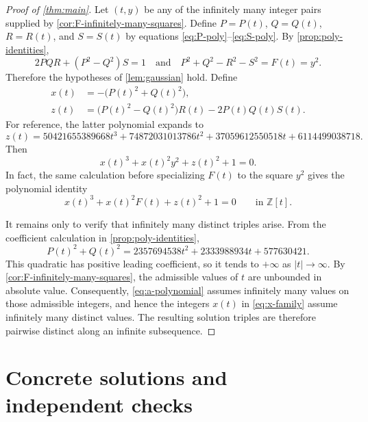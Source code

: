 \documentclass[11pt]{article}
\theoremstyle{remark}
\newcommand{\Z}{\mathbb Z}
\begin{document}
\begin{proof}[Proof of \cref{thm:main}]
Let $(t,y)$ be any of the infinitely many integer pairs supplied by \cref{cor:F-infinitely-many-squares}.  Define $P=P(t)$, $Q=Q(t)$, $R=R(t)$, and $S=S(t)$ by equations \eqref{eq:P-poly}--\eqref{eq:S-poly}.  By \cref{prop:poly-identities},
\[
 2PQR+(P^2-Q^2)S=1
 \quad\text{and}\quad
 P^2+Q^2-R^2-S^2=F(t)=y^2.
\]
Therefore the hypotheses of \cref{lem:gaussian} hold.  Define
\begin{align}
 x(t)&=-\bigl(P(t)^2+Q(t)^2\bigr), \label{eq:x-family}\\
 z(t)&=\bigl(P(t)^2-Q(t)^2\bigr)R(t)-2P(t)Q(t)S(t). \label{eq:z-family}
\end{align}
For reference, the latter polynomial expands to
\begin{equation}\label{eq:z-expanded}
 z(t)=50421655389668t^3+74872031013786t^2
      +37059612550518t+6114499038718.
\end{equation}
Then
\[
 x(t)^3+x(t)^2y^2+z(t)^2+1=0.
\]
In fact, the same calculation before specializing $F(t)$ to the square $y^2$ gives the polynomial identity
\begin{equation}\label{eq:master-polynomial-identity}
 x(t)^3+x(t)^2F(t)+z(t)^2+1=0
 \qquad\text{in }\Z[t].
\end{equation}

It remains only to verify that infinitely many distinct triples arise.  From the coefficient calculation in \cref{prop:poly-identities},
\begin{equation}\label{eq:a-polynomial}
 P(t)^2+Q(t)^2
 =2357694538t^2+2333988934t+577630421.
\end{equation}
This quadratic has positive leading coefficient, so it tends to $+\infty$ as $|t|\to\infty$.  By \cref{cor:F-infinitely-many-squares}, the admissible values of $t$ are unbounded in absolute value.  Consequently, \eqref{eq:a-polynomial} assumes infinitely many values on those admissible integers, and hence the integers $x(t)$ in \eqref{eq:x-family} assume infinitely many distinct values.  The resulting solution triples are therefore pairwise distinct along an infinite subsequence.
\end{proof}



\section{Concrete solutions and independent checks}
\end{document}
